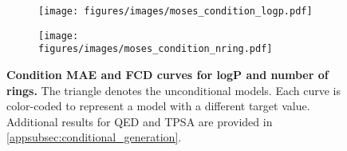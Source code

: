 \begin{figure}[H]
    \centering
    \setlength{\abovecaptionskip}{0pt}  %
    \setlength{\belowcaptionskip}{0pt}  %
    
    \begin{subfigure}[b]{0.49\textwidth}  %
        \centering
        \texttt{[image: figures/images/moses\_condition\_logp.pdf]}
        \label{fig:moses_condition_logp}
    \end{subfigure}
    \hfill  %
    \begin{subfigure}[b]{0.49\textwidth}  %
        \centering
        \texttt{[image: figures/images/moses\_condition\_nring.pdf]}
        \label{fig:moses_condition_nring}
    \end{subfigure}
    
    \caption{\textbf{Condition MAE and FCD curves for logP and number of rings.} The triangle denotes the unconditional models. Each curve is color-coded to represent a model with a different target value. Additional results for QED and TPSA are provided in \cref{appsubsec:conditional_generation}.}
    \label{fig:moses_condition_1}
\end{figure}